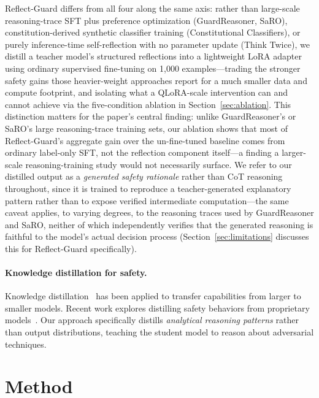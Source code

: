\documentclass[Superintelligence,article,submit,pdftex,moreauthors]{Definitions/mdpi}
\begin{document}
Reflect-Guard differs from all four along the same axis: rather than large-scale reasoning-trace SFT plus preference optimization (GuardReasoner, SaRO), constitution-derived synthetic classifier training (Constitutional Classifiers), or purely inference-time self-reflection with no parameter update (Think Twice), we distill a teacher model's structured reflections into a lightweight LoRA adapter using ordinary supervised fine-tuning on 1{,}000 examples---trading the stronger safety gains those heavier-weight approaches report for a much smaller data and compute footprint, and isolating what a QLoRA-scale intervention can and cannot achieve via the five-condition ablation in Section~\ref{sec:ablation}. This distinction matters for the paper's central finding: unlike GuardReasoner's or SaRO's large reasoning-trace training sets, our ablation shows that most of Reflect-Guard's aggregate gain over the un-fine-tuned baseline comes from ordinary label-only SFT, not the reflection component itself---a finding a larger-scale reasoning-training study would not necessarily surface. We refer to our distilled output as a \emph{generated safety rationale} rather than CoT reasoning throughout, since it is trained to reproduce a teacher-generated explanatory pattern rather than to expose verified intermediate computation---the same caveat applies, to varying degrees, to the reasoning traces used by GuardReasoner and SaRO, neither of which independently verifies that the generated reasoning is faithful to the model's actual decision process (Section~\ref{sec:limitations} discusses this for Reflect-Guard specifically).

\paragraph{Knowledge distillation for safety.}
Knowledge distillation~\citep{hinton2015distilling} has been applied to transfer capabilities from larger to smaller models. Recent work explores distilling safety behaviors from proprietary models~\citep{tunstall2023zephyr}. Our approach specifically distills \emph{analytical reasoning patterns} rather than output distributions, teaching the student model to reason about adversarial techniques.

\section{Method}
\label{sec:method}
\end{document}
